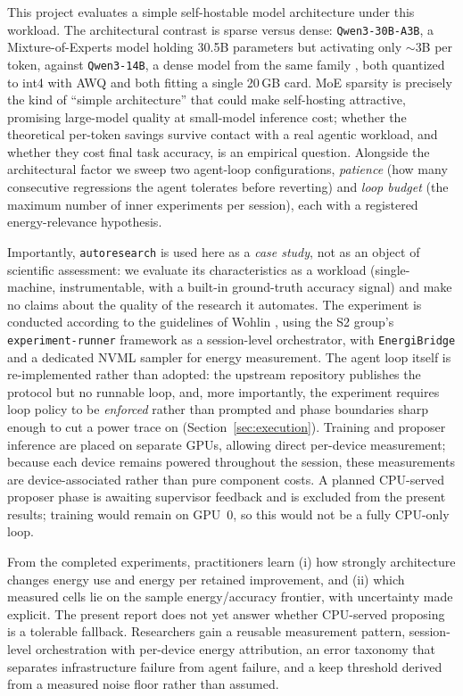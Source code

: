 This project evaluates a simple self-hostable model architecture under this workload. The architectural contrast is sparse versus dense: \texttt{Qwen3-30B-A3B}, a Mixture-of-Experts model holding 30.5B parameters but activating only $\sim$3B per token, against \texttt{Qwen3-14B}, a dense model from the same family \cite{yang2025qwen3}, both quantized to int4 with AWQ \cite{lin2024awq} and both fitting a single 20\,GB card. MoE sparsity is precisely the kind of ``simple architecture'' that could make self-hosting attractive, promising large-model quality at small-model inference cost; whether the theoretical per-token savings survive contact with a real agentic workload, and whether they cost final task accuracy, is an empirical question. Alongside the architectural factor we sweep two agent-loop configurations, \emph{patience} (how many consecutive regressions the agent tolerates before reverting) and \emph{loop budget} (the maximum number of inner experiments per session), each with a registered energy-relevance hypothesis.

Importantly, \texttt{autoresearch} is used here as a \emph{case study}, not as an object of scientific assessment: we evaluate its characteristics as a workload (single-machine, instrumentable, with a built-in ground-truth accuracy signal) and make no claims about the quality of the research it automates. The experiment is conducted according to the guidelines of Wohlin \etal \cite{wohlin12}, using the S2 group's \texttt{experiment-runner} framework \cite{karsten2025experimentrunner} as a session-level orchestrator, with \texttt{EnergiBridge} \cite{sallou2023energibridge} and a dedicated NVML sampler for energy measurement. The agent loop itself is re-implemented rather than adopted: the upstream repository publishes the protocol but no runnable loop, and, more importantly, the experiment requires loop policy to be \emph{enforced} rather than prompted and phase boundaries sharp enough to cut a power trace on (Section~\ref{sec:execution}). Training and proposer inference are placed on separate GPUs, allowing direct per-device measurement; because each device remains powered throughout the session, these measurements are device-associated rather than pure component costs. A planned CPU-served proposer phase is awaiting supervisor feedback and is excluded from the present results; training would remain on GPU~0, so this would not be a fully CPU-only loop.

From the completed experiments, practitioners learn (i) how strongly architecture changes energy use and energy per retained improvement, and (ii) which measured cells lie on the sample energy/accuracy frontier, with uncertainty made explicit. The present report does not yet answer whether CPU-served proposing is a tolerable fallback. Researchers gain a reusable measurement pattern, session-level orchestration with per-device energy attribution, an error taxonomy that separates infrastructure failure from agent failure, and a keep threshold derived from a measured noise floor rather than assumed.
